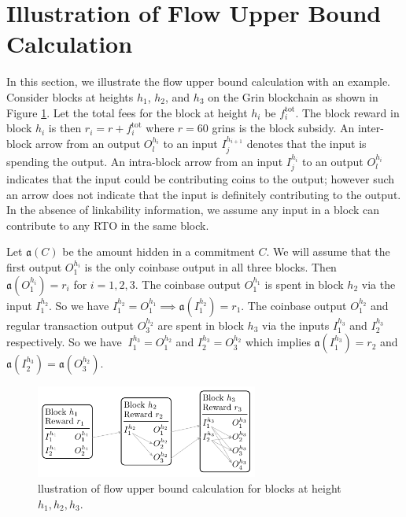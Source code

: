 \section{Illustration of Flow Upper Bound Calculation}
\label{scn:MainIdea}
In this section, we illustrate the flow upper bound calculation with an example.
Consider blocks at heights $h_1$, $h_2$, and $h_3$ on the Grin blockchain as shown in Figure \ref{block_sample}.
Let the total fees for the block at height $h_i$ be $f^{\text{tot}}_i$.
The block reward in block $h_i$ is then $r_i = r + f^{\text{tot}}_i$ where $r=60$ grins is the block subsidy.
An inter-block arrow from an output $O_l^{h_i}$ to an input $I_{j}^{h_{i+1}}$ denotes that the input is spending the output.
An intra-block arrow from an input $I_j^{h_i}$ to an output $O_l^{h_i}$ indicates that the input could be contributing coins to the output; however such an arrow does not indicate that the input is definitely contributing to the output. In the absence of linkability information, we assume any input in a block can contribute to any RTO in the same block.


Let $\mathfrak{a}(C)$ be the amount hidden in a commitment $C$.
We will assume that the first output $O_1^{h_i}$ is the only coinbase output in all three blocks. Then $\mathfrak{a}(O_1^{h_i}) = r_i$ for $i=1,2,3$.
The coinbase output $O_1^{h_1}$ is spent in block $h_2$ via the input $I_1^{h_2}$. So we have $I_1^{h_2} = O_1^{h_1} \implies \mathfrak{a}(I_1^{h_2}) = r_1$. The coinbase output $O_1^{h_2}$ and regular transaction output $O_3^{h_2}$ are spent in block $h_3$ via the inputs $I_1^{h_3}$ and $I_2^{h_3}$ respectively.
So we have $\ I_1^{h_3} = O_1^{h_2}$ and $I_2^{h_3} = O_3^{h_2}$ which implies $\mathfrak{a}(I_1^{h_3}) = r_2$ and $\mathfrak{a}(I_2^{h_3}) = \mathfrak{a}(O_3^{h_2})$.

\begin{figure}[!t]
  \centering
  \includegraphics[width=0.65\textwidth]{Figures/grin_blocks1.pdf}
  \caption{llustration of flow upper bound calculation for blocks at height $h_1, h_2, h_3$.}
  \label{block_sample}
\end{figure}

